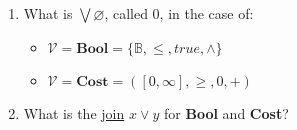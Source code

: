\begin{enumerate}
    \item   What is $\bigvee \varnothing$, called $0$, in the case of:
          \begin{itemize}
            \item $\mathcal{V}=\mathbf{Bool}=\{\mathbb{B},\leq, true,\land\}$
            \item $\mathcal{V}=\mathbf{Cost}=([0,\infty],\geq,0,+)$
          \end{itemize}
    \item What is the \href{doc/1 math/Seven Sketches in Compositionality/Chapter 1: Generative Effects/5 Meets and joins/1 Definition and basic examples/Meet and join}{join} $x \vee y$ for \textbf{Bool} and \textbf{Cost}?
  \end{enumerate}